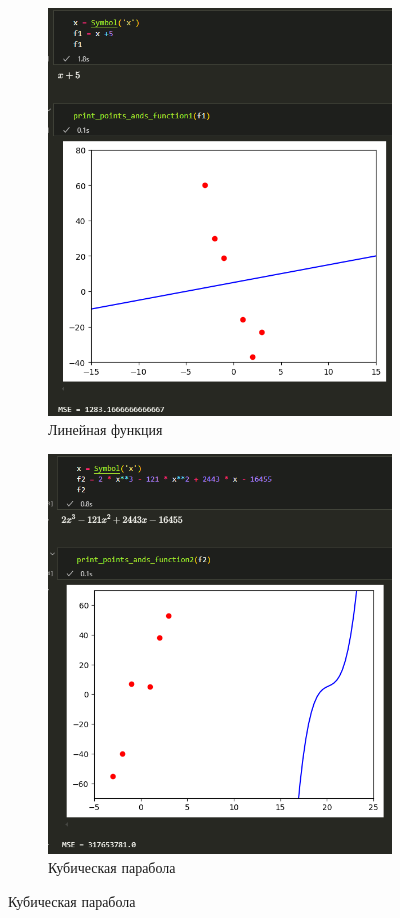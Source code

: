 \documentclass[14pt,a4paper]{extarticle}
\begin{document}
\begin{figure}[h!]
    \begin{subfigure}{.5\textwidth}
        \centering
        \includegraphics[width=0.9\linewidth]{figures/3.2-start1.png}
        \caption{Линейная функция}
        \label{fig:3.2-start1}
    \end{subfigure}%
    \begin{subfigure}{.5\textwidth}
        \centering
        \includegraphics[width=0.9\linewidth]{figures/3.2-start2.png}
        \caption{Кубическая парабола}
        \label{fig:3.2-start2}
    \end{subfigure}


\end{figure}
\end{document}
